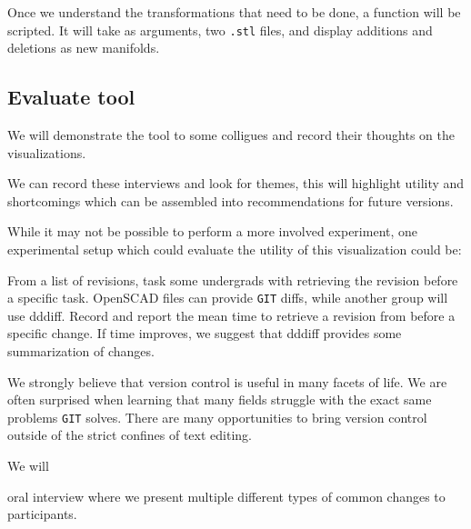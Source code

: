 \documentclass[sigconf,]{acmart}
\begin{document}
Once we understand the transformations that need to be done, a function will be scripted.
It will take as arguments, two \texttt{.stl} files, and display additions and deletions as new manifolds.

\subsection{Evaluate tool}

We will demonstrate the tool to some colligues and record their thoughts on the visualizations.

We can record these interviews and look for themes, this will highlight utility and shortcomings which can be assembled into recommendations for future versions.

While it may not be possible to perform a more involved experiment,
one experimental setup which could evaluate the utility of this visualization could be:

From a list of revisions, task some undergrads with retrieving the revision before a specific task.
OpenSCAD files can provide \texttt{GIT} diffs, while another group will use dddiff.
Record and report the mean time to retrieve a revision from before a specific change.
If time improves, we suggest that dddiff provides some summarization of changes.






We strongly believe that version control is useful in many facets of life.
We are often surprised when learning that many fields struggle with the exact same problems \texttt{GIT} solves.
There are many opportunities to bring version control outside of the strict confines of text editing.





We will

oral interview where we present multiple different types of common changes to participants.
\end{document}
